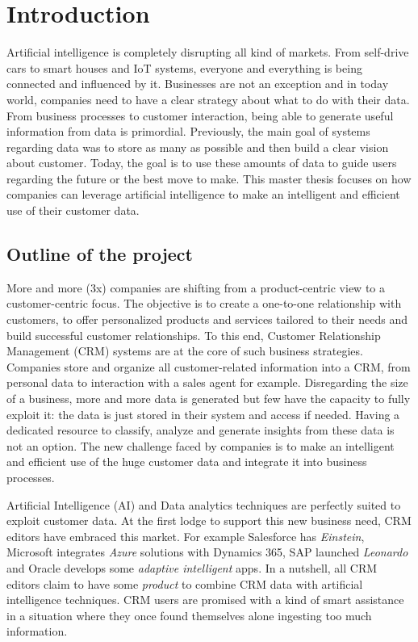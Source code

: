 \chapter{Introduction}

Artificial intelligence is completely disrupting all kind of markets. From self-drive cars to smart houses and IoT systems, everyone and everything is being connected and influenced by it. Businesses are not an exception and in today world, companies need to have a clear strategy about what to do with their data. From business processes to customer interaction, being able to generate useful information from data is primordial. Previously, the main goal of systems regarding data was to store as many as possible and then build a clear vision about customer. Today, the goal is to use these amounts of data to guide users regarding the future or the best move to make. This master thesis focuses on how companies can leverage artificial intelligence to make an intelligent and efficient use of their customer data.


\section{Outline of the project}

More and more (3x) companies are shifting from a product-centric view to a customer-centric focus. The objective is to create a one-to-one relationship with customers, to offer personalized products and services tailored to their needs and build successful customer relationships. To this end, Customer Relationship Management (CRM) systems are at the core of such business strategies. Companies store and organize all customer-related information into a CRM, from personal data to interaction with a sales agent for example. Disregarding the size of a business, more and more data is generated but few have the capacity to fully exploit it: the data is just stored in their system and access if needed. Having a dedicated resource to classify, analyze and generate insights from these data is not an option. The new challenge faced by companies is to make an intelligent and efficient use of the huge customer data and integrate it into business processes.

Artificial Intelligence (AI) and Data analytics techniques are perfectly suited to exploit customer data. At the first lodge to support this new business need, CRM editors have embraced this market. For example Salesforce has \textit{Einstein}, Microsoft integrates \textit{Azure} solutions with Dynamics 365, SAP launched \textit{Leonardo} and Oracle develops some \textit{adaptive intelligent} apps. In a nutshell, all CRM editors claim to have some \textit{product} to combine CRM data with artificial intelligence techniques. CRM users are promised with a kind of smart assistance in a situation where they once found themselves alone ingesting too much information. 

